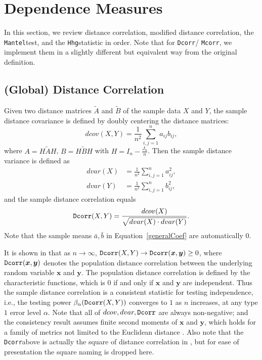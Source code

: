 \documentclass[11pt]{article}
\newcommand{\note}[2][]{\added[#1,remark={#2}]{}}
\providecommand{\sct}[1]{{\sc \texttt{#1}}}
\providecommand{\mb}[1]{\boldsymbol{#1}}
\newcommand{\Hhg}{\sct{Hhg}}
\newcommand{\Dcorr}{\sct{Dcorr}}
\newcommand{\Mcorr}{\sct{Mcorr}}
\newcommand{\Mantel}{\sct{Mantel}}
\newcommand{\cs}[1]{{\note{cs: #1}}}
\begin{document}
\section{Dependence Measures}
\label{appen:methods}

\cs{if we define the generalized correlation coefficient above, then in this section, we should define each measure in terms of what $a_{ij}$ is explicitly. like, each subsection should have an explicit statement/remark: ``Letting X $\leftarrow a_{ij}$, this method is a special case of the generalized correlation coefficient.'' }

In this section, we review distance correlation, modified distance correlation, the \Mantel test, and the \Hhg statistic in order. Note that for \Dcorr / \Mcorr, we implement them in a slightly different but equivalent way from the original definition.

\subsection{(Global) Distance Correlation}
\label{appen:dcorr}
Given two distance matrices $\tilde{A}$ and $\tilde{B}$ of the sample data $X$ and $Y$, the sample distance covariance is defined by doubly centering the distance matrices:
\begin{equation}
\label{dcovEqu}
dcov(X,Y)=\frac{1}{n^2}\sum_{i,j=1}^{n}a_{ij}b_{ij},
\end{equation}
where $A=H\tilde{A}H$, $B=H\tilde{B}H$ with $H=I_{n}-\frac{J_{n}}{n}$. Then the sample distance variance is defined as
\begin{align*}
dvar(X) &=\frac{1}{n^2}\sum_{i,j=1}^{n}a_{ij}^{2},\\
dvar(Y) &=\frac{1}{n^2}\sum_{i,j=1}^{n}b_{ij}^{2},
\end{align*}
and the sample distance correlation equals
\begin{equation}
\label{dcorrEqu}
\Dcorr(X,Y)=\frac{dcov(X)}{\sqrt{dvar(X) \cdot dvar(Y)}}.
\end{equation}
Note that the sample means $\bar{a}, \bar{b}$ in Equation~\ref{generalCoef} are automatically $0$.

It is shown in \cite{SzekelyRizzoBakirov2007} that as $n \rightarrow \infty$, $\Dcorr(X,Y) \rightarrow \Dcorr(\mb{x},\mb{y}) \geq 0$, where $\Dcorr(\mb{x},\mb{y})$ denotes the population distance correlation between the underlying random variable $\mb{x}$ and $\mb{y}$. The population distance correlation is defined by the characteristic functions, which is $0$ if and only if $\mb{x}$ and $\mb{y}$ are independent. Thus the sample distance correlation is a consistent statistic for testing independence, i.e., the testing power $\beta_{\alpha}(\Dcorr(X,Y))$ converges to $1$ as $n$ increases, at any type $1$ error level $\alpha$. Note that all of $dcov, dvar, \Dcorr$ are always non-negative; and the consistency result assumes finite second moments of $\mb{x}$ and $\mb{y}$, which holds for a family of metrics not limited to the Euclidean distance \cite{Lyons2013}. Also note that the \Dcorr above is actually the square of distance correlation in \cite{SzekelyRizzoBakirov2007}, but for ease of presentation the square naming is dropped here.
\end{document}
